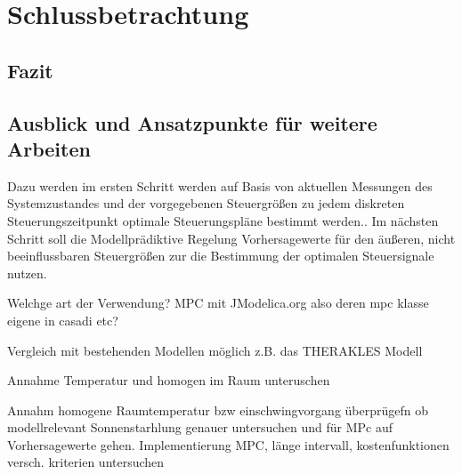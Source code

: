 %
%

\renewcommand{\chapterheadstartvskip}{\vspace*{3cm}}

\chapter{Schlussbetrachtung}
\label{chap:schlussteil}
\renewcommand{\chapterheadstartvskip}{\vspace*{-0.5cm}}

\section{Fazit}
\label{sec:zusammenfassung}



\section{Ausblick und Ansatzpunkte für weitere Arbeiten}
\label{sec:ausblick}

Dazu werden im ersten Schritt werden auf Basis von aktuellen Messungen des Systemzustandes und der vorgegebenen Steuergrößen zu jedem diskreten Steuerungszeitpunkt optimale Steuerungspläne bestimmt werden..
Im nächsten Schritt soll die Modellprädiktive Regelung Vorhersagewerte für den äußeren, nicht beeinflussbaren Steuergrößen zur die Bestimmung der optimalen Steuersignale nutzen.

Welchge art der Verwendung?
MPC mit JModelica.org also deren mpc klasse
eigene in casadi
etc?

Vergleich mit bestehenden Modellen möglich z.B. das THERAKLES Modell

Annahme Temperatur und homogen im Raum unteruschen

Annahm homogene Raumtemperatur bzw einschwingvorgang überprügefn ob modellrelevant
Sonnenstarhlung genauer untersuchen und für MPc auf Vorhersagewerte gehen.
Implementierung MPC, länge intervall, kostenfunktionen versch. kriterien untersuchen